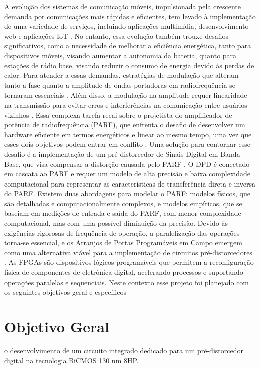 A evolução dos sistemas de comunicação móveis, impulsionada pela crescente demanda por
comunicações mais rápidas e eficientes, tem levado à implementação de uma variedade de serviços,
incluindo aplicações multimídia, desenvolvimento web e aplicações IoT \cite{John2016}. No entanto, essa
evolução também trouxe desafios significativos, como a necessidade de melhorar a eficiência
energética, tanto para dispositivos móveis, visando aumentar a autonomia da bateria, quanto para
estações de rádio base, visando reduzir o consumo de energia devido às perdas de calor.
Para atender a essas demandas, estratégias de modulação que alteram tanto a fase quanto a
amplitude de ondas portadoras em radiofrequência se tornaram essenciais \cite{Kenington2000}. Além disso, a
modulação na amplitude requer linearidade na transmissão para evitar erros e interferências na
comunicação entre usuários vizinhos \cite{Cripps2006}. Essa complexa tarefa recai sobre o projetista do
amplificador de potência de radiofrequência (PARF), que enfrenta o desafio de desenvolver um
hardware eficiente em termos energéticos e linear ao mesmo tempo, uma vez que esses dois objetivos
podem entrar em conflito \cite{Chavez2018}.
Uma solução para contornar esse desafio é a implementação de um pré-distorcedor de Sinais
Digital em Banda Base, que visa compensar a distorção causada pelo PARF \cite{Cripps2006}. O DPD é conectado em cascata ao PARF e requer um modelo de alta precisão e baixa complexidade computacional para representar as características de transferência direta e inversa do PARF. Existem duas abordagens para modelar o PARF: modelos físicos, que são detalhadas e computacionalmente complexos, e modelos empíricos, que se baseiam em medições de entrada e saída do PARF, com menor complexidade computacional, mas com uma possível diminuição da precisão.
Devido às exigências rigorosas de frequência de operação, a paralelização das operações
torna-se essencial, e os Arranjos de Portas Programáveis em Campo emergem como uma
alternativa viável para a implementação de circuitos pré-distorcedores \cite{Pedroni2010}. As FPGAs são dispositivos
lógicos programáveis que permitem a reconfiguração física de componentes de eletrônica digital,
acelerando processos e suportando operações paralelas e sequenciais. Neste contexto esse projeto foi planejado com os seguintes objetivos geral e específicos

\section{Objetivo Geral}
o desenvolvimento de um circuito integrado dedicado para um pré-distorcedor digital na tecnologia BiCMOS 130 nm 8HP.


